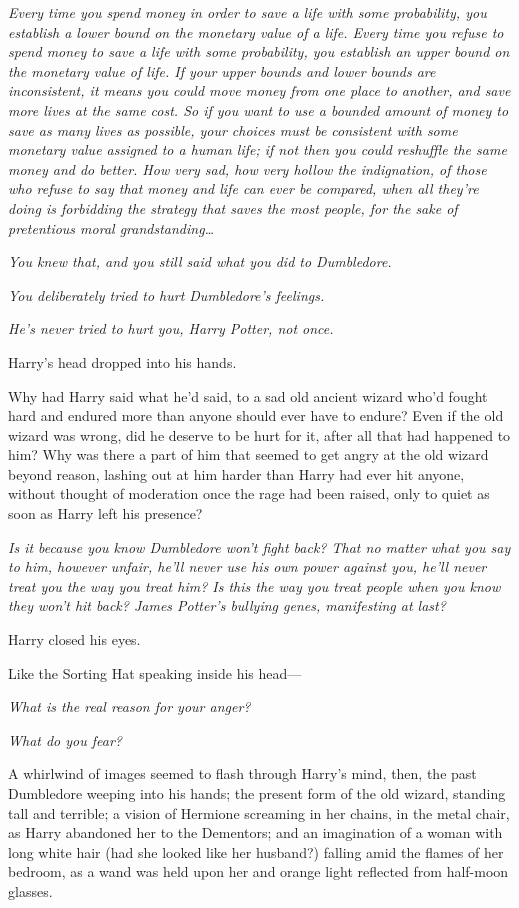 \emph{Every time you spend money in order to save a life with some probability,
you establish a lower bound on the monetary value of a life. Every time you
refuse to spend money to save a life with some probability, you establish an
upper bound on the monetary value of life. If your upper bounds and lower
bounds are inconsistent, it means you could move money from one place to
another, and save more lives at the same cost. So if you want to use a bounded
amount of money to save as many lives as possible, your choices must be
consistent with \emph{some} monetary value assigned to a human life; if not
then you could reshuffle the same money and do better. How very sad, how very
hollow the indignation, of those who refuse to say that money and life can ever
be compared, when all they’re doing is forbidding the strategy that saves the
most people, for the sake of pretentious moral grandstanding…}

\emph{You \emph{knew} that, and you still said what you did to Dumbledore.}

\emph{You deliberately \emph{tried} to hurt Dumbledore’s feelings.}

\emph{\emph{He’s} never tried to hurt \emph{you,} Harry Potter, not once.}

Harry’s head dropped into his hands.

Why had Harry said what he’d said, to a sad old ancient wizard who’d fought
hard and endured more than anyone should ever have to endure? Even if the old
wizard was wrong, did he deserve to be hurt for it, after all that had happened
to him? Why was there a part of him that seemed to get angry at the old wizard
beyond reason, lashing out at him harder than Harry had ever hit anyone,
without thought of moderation once the rage had been raised, only to quiet as
soon as Harry left his presence?

\emph{Is it because you know Dumbledore won’t fight back? That no matter what
you say to him, however unfair, he’ll never use his own power against you,
he’ll never treat you the way you treat him? Is this the way you treat people
when you know they won’t hit back? James Potter’s bullying genes, manifesting
at last?}

Harry closed his eyes.

Like the Sorting Hat speaking inside his head—

\emph{What is the real reason for your anger?}

\emph{What do you fear?}

A whirlwind of images seemed to flash through Harry’s mind, then, the past
Dumbledore weeping into his hands; the present form of the old wizard, standing
tall and terrible; a vision of Hermione screaming in her chains, in the metal
chair, as Harry abandoned her to the Dementors; and an imagination of a woman
with long white hair (had she looked like her husband?) falling amid the flames
of her bedroom, as a wand was held upon her and orange light reflected from
half-moon glasses.

